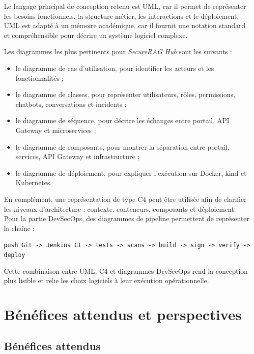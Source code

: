 Le langage principal de conception retenu est UML, car il permet de représenter les besoins fonctionnels, la structure métier, les interactions et le déploiement. UML est adapté à un mémoire académique, car il fournit une notation standard et compréhensible pour décrire un système logiciel complexe.

Les diagrammes les plus pertinents pour \textit{SecureRAG Hub} sont les suivants :

\begin{itemize}
    \item le diagramme de cas d'utilisation, pour identifier les acteurs et les fonctionnalités ;
    \item le diagramme de classes, pour représenter utilisateurs, rôles, permissions, chatbots, conversations et incidents ;
    \item le diagramme de séquence, pour décrire les échanges entre portail, API Gateway et microservices ;
    \item le diagramme de composants, pour montrer la séparation entre portail, services, API Gateway et infrastructure ;
    \item le diagramme de déploiement, pour expliquer l'exécution sur Docker, kind et Kubernetes.
\end{itemize}

En complément, une représentation de type C4 peut être utilisée afin de clarifier les niveaux d'architecture : contexte, conteneurs, composants et déploiement. Pour la partie DevSecOps, des diagrammes de pipeline permettent de représenter la chaîne :

\begin{center}
\texttt{push Git -> Jenkins CI -> tests -> scans -> build -> sign -> verify -> deploy}
\end{center}

Cette combinaison entre UML, C4 et diagrammes DevSecOps rend la conception plus lisible et relie les choix logiciels à leur exécution opérationnelle.

\section{Bénéfices attendus et perspectives}

\subsection{Bénéfices attendus}

